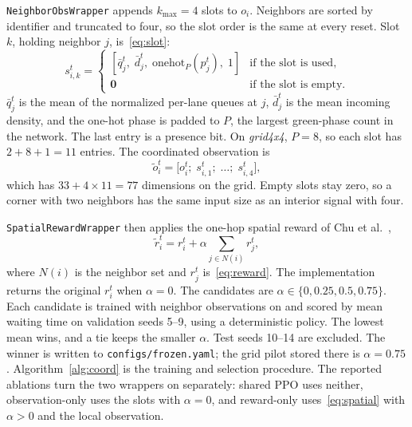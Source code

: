 \documentclass[conference]{IEEEtran}
\begin{document}
\texttt{NeighborObsWrapper} appends $k_{\max} = 4$ slots to $o_i$. Neighbors are sorted by identifier and truncated to four, so the slot order is the same at every reset. Slot $k$, holding neighbor $j$, is~\eqref{eq:slot}:
\begin{equation}
s_{i,k}^t =
\begin{cases}
[\bar{q}_j^t,\; \bar{d}_j^t,\; \mathrm{onehot}_{P}(p_j^t),\; 1] & \text{if the slot is used}, \\
\mathbf{0} & \text{if the slot is empty}.
\end{cases}
\label{eq:slot}
\end{equation}
$\bar{q}_j^t$ is the mean of the normalized per-lane queues at $j$, $\bar{d}_j^t$ is the mean incoming density, and the one-hot phase is padded to $P$, the largest green-phase count in the network. The last entry is a presence bit. On \emph{grid4x4}, $P = 8$, so each slot has $2 + 8 + 1 = 11$ entries. The coordinated observation is
\begin{equation}
\tilde{o}_i^t = \big[ o_i^t;\; s_{i,1}^t;\; \ldots;\; s_{i,4}^t \big],
\label{eq:coordobs}
\end{equation}
which has $33 + 4 \times 11 = 77$ dimensions on the grid. Empty slots stay zero, so a corner with two neighbors has the same input size as an interior signal with four.

\texttt{SpatialRewardWrapper} then applies the one-hop spatial reward of Chu et al.~\cite{chu2020ma2c},
\begin{equation}
\tilde{r}_i^t = r_i^t + \alpha \sum_{j \in N(i)} r_j^t,
\label{eq:spatial}
\end{equation}
where $N(i)$ is the neighbor set and $r_j^t$ is~\eqref{eq:reward}. The implementation returns the original $r_i^t$ when $\alpha = 0$. The candidates are $\alpha \in \{0, 0.25, 0.5, 0.75\}$. Each candidate is trained with neighbor observations on and scored by mean waiting time on validation seeds 5--9, using a deterministic policy. The lowest mean wins, and a tie keeps the smaller $\alpha$. Test seeds 10--14 are excluded. The winner is written to \texttt{configs/frozen.yaml}; the grid pilot stored there is $\alpha = 0.75$. Algorithm~\ref{alg:coord} is the training and selection procedure. The reported ablations turn the two wrappers on separately: shared PPO uses neither, observation-only uses the slots with $\alpha = 0$, and reward-only uses~\eqref{eq:spatial} with $\alpha > 0$ and the local observation.
\end{document}
